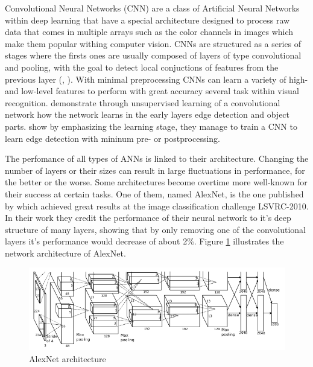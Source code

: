Convolutional Neural Networks (CNN) are a class of Artificial Neural Networks within deep learning that have a special architecture designed to process raw data that comes in multiple arrays such as the color channels in images which make them popular withing computer vision. CNNs are structured as a series of stages where the firsts ones are usually composed of layers of type convolutional and pooling, with the goal to detect local conjuctions of features from the previous layer (\parencite{Lecun2015}, \parencite{Jarrett2009}). With minimal preprocessing CNNs can learn a variety of high- and low-level features to perform with great accuracy several task within visual recognition. \textcite{Lee2009} demonstrate through unsupervised learning of a convolutional network how the network learns in the early layers edge detection and object parts. \textcite{Turaga2010} show by emphasizing the learning stage, they manage to train a CNN to learn edge detection with mininum pre- or postprocessing.

The perfomance of all types of ANNs is linked to their architecture. Changing the number of layers or their sizes can result in large fluctuations in performance, for the better or the worse. Some architectures become overtime more well-known for their success at certain tasks. One of them, named AlexNet, is the one published by \textcite{Krizhevsky2012} which achieved great results at the \textcite{ImageNet} image classification challenge LSVRC-2010. In their work they credit the performance of their neural network to it's deep structure of many layers, showing that by only removing one of the convolutional layers it's performance would decrease of about 2\%. Figure \ref{fig:alexnet_orig} illustrates the network architecture of AlexNet.

\begin{figure}
	\centering
	\includegraphics[width=\textwidth]{img/methods/alexnet_original.png}
	\caption{AlexNet architecture}
	\label{fig:alexnet_orig}
\end{figure}

